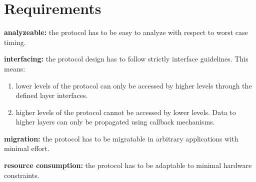 \section{Requirements}
\label{sec:bus:requirements}

\begin{req}
\label{req:ulftrtp:analyzeable}
\textbf{analyzeable: }the protocol has to be easy to analyze with respect to worst case timing.
\end{req}

\begin{req}
\label{req:ulftrtp:interfacing}
\textbf{interfacing: }the protocol design has to follow strictly interface guidelines. This means:
\begin{enumerate}
 \item lower levels of the protocol can only be accessed by higher levels through the defined layer interfaces.
 \item higher levels of the protocol cannot be accessed by lower levels. Data to higher layers can only be propagated 
using callback mechanisms. 
\end{enumerate}

\end{req}

\begin{req}
\label{req:ulftrtp:easy migration}
\textbf{migration: }the protocol has to be migratable in arbitrary applications with minimal effort.
\end{req}

\begin{req}
\label{req:ulftrtp:resource consumption}
\textbf{resource consumption: }the protocol has to be adaptable to minimal hardware constraints.
\end{req}
